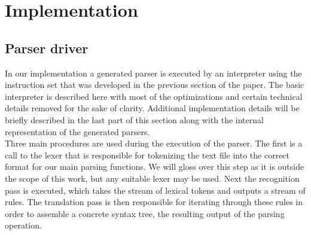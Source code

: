 \documentclass[a4paper,11pt]{article}
\begin{document}




\section{Implementation}
\subsection{Parser driver}

In our implementation a generated parser is executed by an interpreter using the instruction set that was developed in the previous section of the paper.
The basic interpreter is described here with most of the optimizations and certain technical details removed for the sake of clarity. 
Additional implementation details will be briefly described in the last part of this section along with the internal representation of the generated parsers.\\
Three main procedures are used during the execution of the parser. 
The first is a call to the lexer that is responsible for tokenizing the text file into the correct format for our main parsing functions.
We will gloss over this step as it is outside the scope of this work, but any suitable lexer may be used.
Next the recognition pass is executed, which takes the stream of lexical tokens and outputs a stream of rules. 
The translation pass is then responsible for iterating through these rules in order to assemble a concrete syntax tree, the resulting output of the parsing operation.
\end{document}
